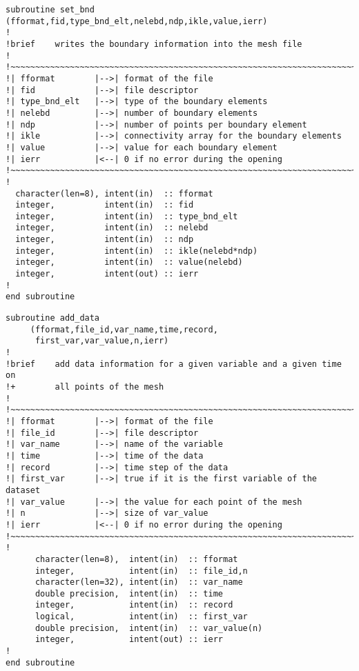 %
\begin{lstlisting}
subroutine set_bnd (fformat,fid,type_bnd_elt,nelebd,ndp,ikle,value,ierr)
!
!brief    writes the boundary information into the mesh file
!
!~~~~~~~~~~~~~~~~~~~~~~~~~~~~~~~~~~~~~~~~~~~~~~~~~~~~~~~~~~~~~~~~~~~~~~~
!| fformat        |-->| format of the file
!| fid            |-->| file descriptor
!| type_bnd_elt   |-->| type of the boundary elements
!| nelebd         |-->| number of boundary elements
!| ndp            |-->| number of points per boundary element
!| ikle           |-->| connectivity array for the boundary elements
!| value          |-->| value for each boundary element
!| ierr           |<--| 0 if no error during the opening
!~~~~~~~~~~~~~~~~~~~~~~~~~~~~~~~~~~~~~~~~~~~~~~~~~~~~~~~~~~~~~~~~~~~~~~~
!
  character(len=8), intent(in)  :: fformat
  integer,          intent(in)  :: fid
  integer,          intent(in)  :: type_bnd_elt
  integer,          intent(in)  :: nelebd
  integer,          intent(in)  :: ndp
  integer,          intent(in)  :: ikle(nelebd*ndp)
  integer,          intent(in)  :: value(nelebd)
  integer,          intent(out) :: ierr
!
end subroutine
\end{lstlisting}
%
\begin{lstlisting}
subroutine add_data
     (fformat,file_id,var_name,time,record,
      first_var,var_value,n,ierr)
!
!brief    add data information for a given variable and a given time on 
!+        all points of the mesh
!
!~~~~~~~~~~~~~~~~~~~~~~~~~~~~~~~~~~~~~~~~~~~~~~~~~~~~~~~~~~~~~~~~~~~~~~~
!| fformat        |-->| format of the file
!| file_id        |-->| file descriptor
!| var_name       |-->| name of the variable
!| time           |-->| time of the data
!| record         |-->| time step of the data
!| first_var      |-->| true if it is the first variable of the dataset
!| var_value      |-->| the value for each point of the mesh
!| n              |-->| size of var_value
!| ierr           |<--| 0 if no error during the opening
!~~~~~~~~~~~~~~~~~~~~~~~~~~~~~~~~~~~~~~~~~~~~~~~~~~~~~~~~~~~~~~~~~~~~~~~
!
      character(len=8),  intent(in)  :: fformat
      integer,           intent(in)  :: file_id,n
      character(len=32), intent(in)  :: var_name
      double precision,  intent(in)  :: time
      integer,           intent(in)  :: record
      logical,           intent(in)  :: first_var
      double precision,  intent(in)  :: var_value(n)
      integer,           intent(out) :: ierr
!
end subroutine
\end{lstlisting}

%
